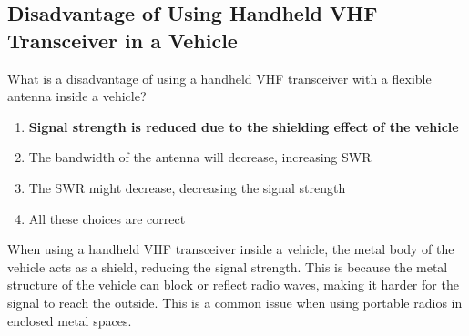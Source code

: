 \subsection{Disadvantage of Using Handheld VHF Transceiver in a Vehicle}
\label{T9A07}

\begin{tcolorbox}[colback=gray!10!white,colframe=black!75!black,title=T9A07]
What is a disadvantage of using a handheld VHF transceiver with a flexible antenna inside a vehicle?
\begin{enumerate}[noitemsep]
    \item \textbf{Signal strength is reduced due to the shielding effect of the vehicle}
    \item The bandwidth of the antenna will decrease, increasing SWR
    \item The SWR might decrease, decreasing the signal strength
    \item All these choices are correct
\end{enumerate}
\end{tcolorbox}

When using a handheld VHF transceiver inside a vehicle, the metal body of the vehicle acts as a shield, reducing the signal strength. This is because the metal structure of the vehicle can block or reflect radio waves, making it harder for the signal to reach the outside. This is a common issue when using portable radios in enclosed metal spaces.